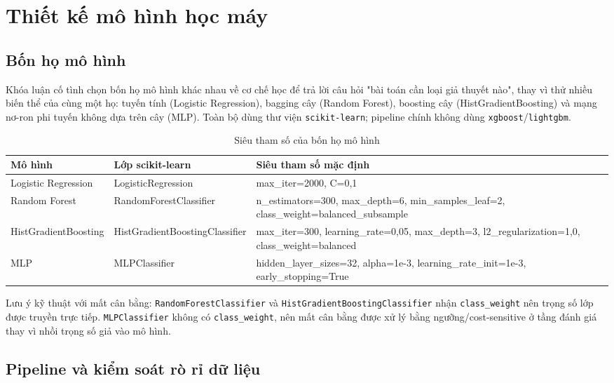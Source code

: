 \section{Thiết kế mô hình học máy}
\label{sec:models}

\subsection{Bốn họ mô hình}

Khóa luận cố tình chọn bốn họ mô hình khác nhau về cơ chế học để trả lời câu hỏi "bài toán cần loại
giả thuyết nào", thay vì thử nhiều biến thể của cùng một họ: tuyến tính (Logistic Regression),
bagging cây (Random Forest), boosting cây (HistGradientBoosting) và mạng nơ-ron phi tuyến không dựa
trên cây (MLP). Toàn bộ dùng thư viện \texttt{scikit-learn}; pipeline chính không dùng
\texttt{xgboost}/\texttt{lightgbm}.

\begin{table}[H]
\centering
\caption{Siêu tham số của bốn họ mô hình}
\label{tab:hyperparams}
\begin{tabular}{|l|l|p{7.4cm}|}
\hline
\textbf{Mô hình} & \textbf{Lớp scikit-learn} & \textbf{Siêu tham số mặc định} \\
\hline
Logistic Regression & LogisticRegression & max\_iter=2000, C=0,1 \\
Random Forest & RandomForestClassifier & n\_estimators=300, max\_depth=6,
min\_samples\_leaf=2, class\_weight=balanced\_subsample \\
HistGradientBoosting & HistGradientBoostingClassifier & max\_iter=300, learning\_rate=0,05,
max\_depth=3, l2\_regularization=1,0, class\_weight=balanced \\
MLP & MLPClassifier & hidden\_layer\_sizes=32, alpha=1e-3, learning\_rate\_init=1e-3,
early\_stopping=True \\
\hline
\end{tabular}
\end{table}

Lưu ý kỹ thuật với mất cân bằng: \texttt{RandomForestClassifier} và
\texttt{HistGradientBoostingClassifier} nhận \texttt{class\_weight} nên trọng số lớp được truyền
trực tiếp. \texttt{MLPClassifier} không có \texttt{class\_weight}, nên mất cân bằng được xử lý bằng
ngưỡng/cost-sensitive ở tầng đánh giá thay vì nhồi trọng số giả vào mô hình.

\subsection{Pipeline và kiểm soát rò rỉ dữ liệu}

